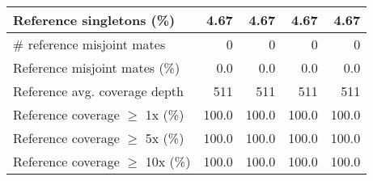 \documentclass[12pt,a4paper]{article}
\begin{document}
\begin{table}[ht]
\begin{center}
\begin{tabular}{|l*{4}{|r}|}
Reference singletons (\%) & 4.67 & 4.67 & 4.67 & 4.67 \\ \hline
\# reference misjoint mates & 0 & 0 & 0 & 0 \\ \hline
Reference misjoint mates (\%) & 0.0 & 0.0 & 0.0 & 0.0 \\ \hline
Reference avg. coverage depth & 511 & 511 & 511 & 511 \\ \hline
Reference coverage $\geq$ 1x (\%) & 100.0 & 100.0 & 100.0 & 100.0 \\ \hline
Reference coverage $\geq$ 5x (\%) & 100.0 & 100.0 & 100.0 & 100.0 \\ \hline
Reference coverage $\geq$ 10x (\%) & 100.0 & 100.0 & 100.0 & 100.0 \\ \hline
\end{tabular}
\end{center}
\end{table}
\end{document}
